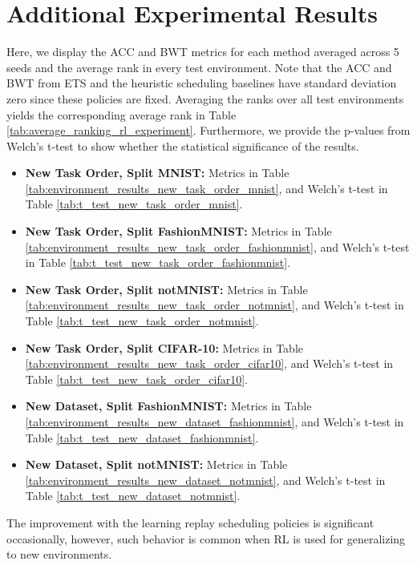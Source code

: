
\section{Additional Experimental Results}\label{paperD:app:additional_experimental_results}


Here, we display the ACC and BWT metrics for each method averaged across 5 seeds and the average rank in every test environment. Note that the ACC and BWT from ETS and the heuristic scheduling baselines have standard deviation zero since these policies are fixed. Averaging the ranks over all test environments yields the corresponding average rank in Table \ref{tab:average_ranking_rl_experiment}. Furthermore, we provide the p-values from Welch's t-test to show whether the statistical significance of the results. 
\begin{itemize}[topsep=0pt,noitemsep]
	\item \textbf{New Task Order, Split MNIST:} Metrics in Table \ref{tab:environment_results_new_task_order_mnist}, and Welch's t-test in Table \ref{tab:t_test_new_task_order_mnist}.  
	
	\item \textbf{New Task Order, Split FashionMNIST:} Metrics in Table \ref{tab:environment_results_new_task_order_fashionmnist}, and Welch's t-test in Table \ref{tab:t_test_new_task_order_fashionmnist}.  
	
	\item \textbf{New Task Order, Split notMNIST:} Metrics in Table \ref{tab:environment_results_new_task_order_notmnist}, and Welch's t-test in Table \ref{tab:t_test_new_task_order_notmnist}.  
	
	\item \textbf{New Task Order, Split CIFAR-10:} Metrics in Table \ref{tab:environment_results_new_task_order_cifar10}, and Welch's t-test in Table \ref{tab:t_test_new_task_order_cifar10}. 
	
	\item \textbf{New Dataset, Split FashionMNIST:} Metrics in Table \ref{tab:environment_results_new_dataset_fashionmnist}, and Welch's t-test in Table \ref{tab:t_test_new_dataset_fashionmnist}. 
	
	\item \textbf{New Dataset, Split notMNIST:} Metrics in Table \ref{tab:environment_results_new_dataset_notmnist}, and Welch's t-test in Table \ref{tab:t_test_new_dataset_notmnist}. 
\end{itemize}
The improvement with the learning replay scheduling policies is significant occasionally, however, such behavior is common when RL is used for generalizing to new environments.



